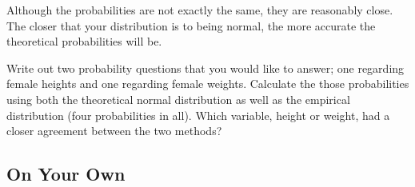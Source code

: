 \documentclass{article}\usepackage[]{graphicx}\usepackage[]{color}
\begin{document}
Although the probabilities are not exactly the same, they are reasonably close. The closer that your distribution is to being normal, the more accurate the theoretical probabilities will be.

\begin{exercise}
Write out two probability questions that you would like to answer; one regarding female heights and one regarding female weights.  Calculate the those probabilities using both the theoretical normal distribution as well as the empirical distribution (four probabilities in all).  Which variable, height or weight, had a closer agreement between the two methods?
\end{exercise}

\vspace{2cm}

\subsection*{On Your Own}
\end{document}
